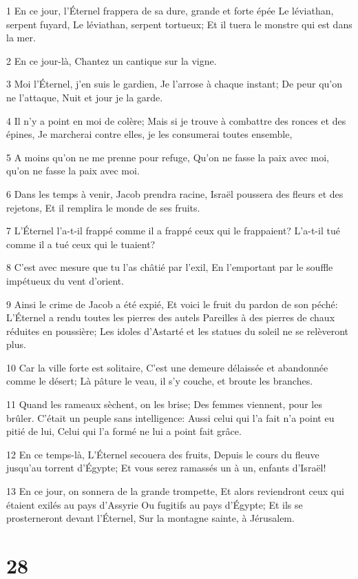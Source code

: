 \par 1 En ce jour, l'Éternel frappera de sa dure, grande et forte épée Le léviathan, serpent fuyard, Le léviathan, serpent tortueux; Et il tuera le monstre qui est dans la mer.
\par 2 En ce jour-là, Chantez un cantique sur la vigne.
\par 3 Moi l'Éternel, j'en suis le gardien, Je l'arrose à chaque instant; De peur qu'on ne l'attaque, Nuit et jour je la garde.
\par 4 Il n'y a point en moi de colère; Mais si je trouve à combattre des ronces et des épines, Je marcherai contre elles, je les consumerai toutes ensemble,
\par 5 A moins qu'on ne me prenne pour refuge, Qu'on ne fasse la paix avec moi, qu'on ne fasse la paix avec moi.
\par 6 Dans les temps à venir, Jacob prendra racine, Israël poussera des fleurs et des rejetons, Et il remplira le monde de ses fruits.
\par 7 L'Éternel l'a-t-il frappé comme il a frappé ceux qui le frappaient? L'a-t-il tué comme il a tué ceux qui le tuaient?
\par 8 C'est avec mesure que tu l'as châtié par l'exil, En l'emportant par le souffle impétueux du vent d'orient.
\par 9 Ainsi le crime de Jacob a été expié, Et voici le fruit du pardon de son péché: L'Éternel a rendu toutes les pierres des autels Pareilles à des pierres de chaux réduites en poussière; Les idoles d'Astarté et les statues du soleil ne se relèveront plus.
\par 10 Car la ville forte est solitaire, C'est une demeure délaissée et abandonnée comme le désert; Là pâture le veau, il s'y couche, et broute les branches.
\par 11 Quand les rameaux sèchent, on les brise; Des femmes viennent, pour les brûler. C'était un peuple sans intelligence: Aussi celui qui l'a fait n'a point eu pitié de lui, Celui qui l'a formé ne lui a point fait grâce.
\par 12 En ce temps-là, L'Éternel secouera des fruits, Depuis le cours du fleuve jusqu'au torrent d'Égypte; Et vous serez ramassés un à un, enfants d'Israël!
\par 13 En ce jour, on sonnera de la grande trompette, Et alors reviendront ceux qui étaient exilés au pays d'Assyrie Ou fugitifs au pays d'Égypte; Et ils se prosterneront devant l'Éternel, Sur la montagne sainte, à Jérusalem.

\chapter{28}

